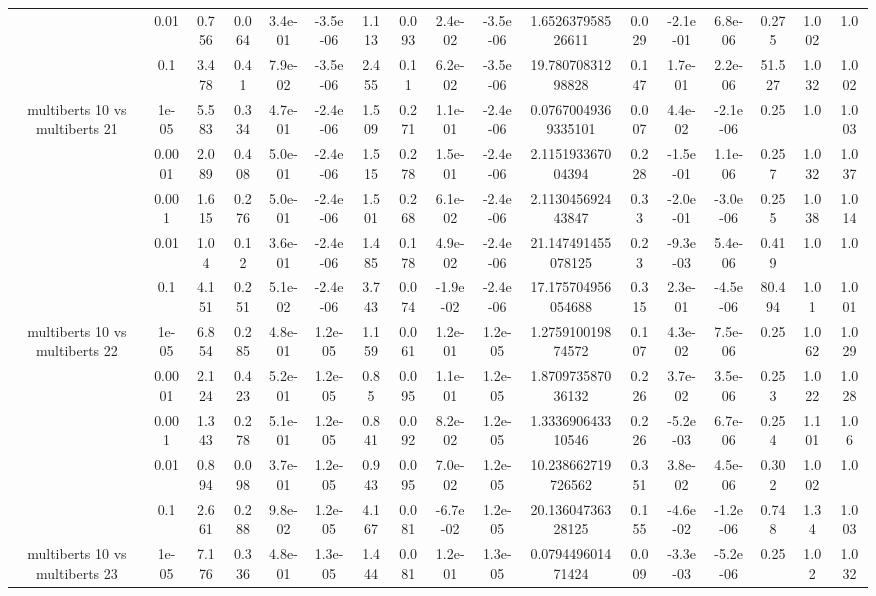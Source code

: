 \begin{tabular}{|c|c|c|c|c|c|c|c|c|c|c|c|c|c|c|c|c|}
 & 0.01 & 0.756 & 0.064 & 3.4e-01 & -3.5e-06 & 1.113 & 0.093 & 2.4e-02 & -3.5e-06 & 1.652637958526611 & 0.029 & -2.1e-01 & 6.8e-06 & 0.275 & 1.002 & 1.0 \\
 & 0.1 & 3.478 & 0.41 & 7.9e-02 & -3.5e-06 & 2.455 & 0.11 & 6.2e-02 & -3.5e-06 & 19.78070831298828 & 0.147 & 1.7e-01 & 2.2e-06 & 51.527 & 1.032 & 1.002 \\
\hline
\multirow{5}{*}{multiberts 10 vs multiberts 21} & 1e-05 & 5.583 & 0.334 & 4.7e-01 & -2.4e-06 & 1.509 & 0.271 & 1.1e-01 & -2.4e-06 & 0.07670049369335101 & 0.007 & 4.4e-02 & -2.1e-06 & 0.25 & 1.0 & 1.003 \\
 & 0.0001 & 2.089 & 0.408 & 5.0e-01 & -2.4e-06 & 1.515 & 0.278 & 1.5e-01 & -2.4e-06 & 2.115193367004394 & 0.228 & -1.5e-01 & 1.1e-06 & 0.257 & 1.032 & 1.037 \\
 & 0.001 & 1.615 & 0.276 & 5.0e-01 & -2.4e-06 & 1.501 & 0.268 & 6.1e-02 & -2.4e-06 & 2.113045692443847 & 0.33 & -2.0e-01 & -3.0e-06 & 0.255 & 1.038 & 1.014 \\
 & 0.01 & 1.04 & 0.12 & 3.6e-01 & -2.4e-06 & 1.485 & 0.178 & 4.9e-02 & -2.4e-06 & 21.147491455078125 & 0.23 & -9.3e-03 & 5.4e-06 & 0.419 & 1.0 & 1.0 \\
 & 0.1 & 4.151 & 0.251 & 5.1e-02 & -2.4e-06 & 3.743 & 0.074 & -1.9e-02 & -2.4e-06 & 17.175704956054688 & 0.315 & 2.3e-01 & -4.5e-06 & 80.494 & 1.01 & 1.001 \\
\hline
\multirow{5}{*}{multiberts 10 vs multiberts 22} & 1e-05 & 6.854 & 0.285 & 4.8e-01 & 1.2e-05 & 1.159 & 0.061 & 1.2e-01 & 1.2e-05 & 1.275910019874572 & 0.107 & 4.3e-02 & 7.5e-06 & 0.25 & 1.062 & 1.029 \\
 & 0.0001 & 2.124 & 0.423 & 5.2e-01 & 1.2e-05 & 0.85 & 0.095 & 1.1e-01 & 1.2e-05 & 1.870973587036132 & 0.226 & 3.7e-02 & 3.5e-06 & 0.253 & 1.022 & 1.028 \\
 & 0.001 & 1.343 & 0.278 & 5.1e-01 & 1.2e-05 & 0.841 & 0.092 & 8.2e-02 & 1.2e-05 & 1.333690643310546 & 0.226 & -5.2e-03 & 6.7e-06 & 0.254 & 1.101 & 1.06 \\
 & 0.01 & 0.894 & 0.098 & 3.7e-01 & 1.2e-05 & 0.943 & 0.095 & 7.0e-02 & 1.2e-05 & 10.238662719726562 & 0.351 & 3.8e-02 & 4.5e-06 & 0.302 & 1.002 & 1.0 \\
 & 0.1 & 2.661 & 0.288 & 9.8e-02 & 1.2e-05 & 4.167 & 0.081 & -6.7e-02 & 1.2e-05 & 20.13604736328125 & 0.155 & -4.6e-02 & -1.2e-06 & 0.748 & 1.34 & 1.003 \\
\hline
\multirow{5}{*}{multiberts 10 vs multiberts 23} & 1e-05 & 7.176 & 0.336 & 4.8e-01 & 1.3e-05 & 1.444 & 0.081 & 1.2e-01 & 1.3e-05 & 0.079449601471424 & 0.009 & -3.3e-03 & -5.2e-06 & 0.25 & 1.02 & 1.032 \\

\end{tabular}
